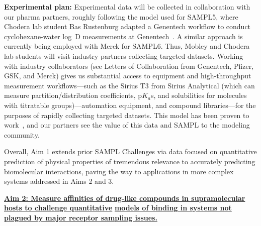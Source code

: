 \documentclass[11pt]{article}
\begin{document}
  
{\bf Experimental plan:}
Experimental data will be collected in collaboration with our pharma partners, roughly following the model used for SAMPL5, where Chodera lab student Bas Rustenburg adapted a Genentech workflow to conduct cyclohexane-water log~D measurements at Genentech~\cite{rustenburg_measuring_2016}.
A similar approach is currently being employed with Merck for SAMPL6.
Thus, Mobley and Chodera lab students will visit industry partners collecting targeted datasets.
Working with industry collaborators (see Letters of Collaboration from Genentech, Pfizer, GSK, and Merck) gives us substantial access to equipment and high-throughput measurement workflows---such as the Sirius T3 from Sirius Analytical (which can measure partition/distribution coefficients, p$K_a$s, and solubilities for molecules with titratable groups)---automation equipment, and compound libraries---for the purposes of rapidly collecting targeted datasets.
This model has been proven to work~\cite{rustenburg_measuring_2016}, and our partners see the value of this data and SAMPL to the modeling community.

Overall, Aim 1 extends prior SAMPL Challenges via data focused on quantitative prediction of physical properties of tremendous relevance to accurately predicting biomolecular interactions, paving the way to applications in more complex systems addressed in Aims 2 and 3.


\textbf{\underline{Aim 2: Measure affinities of drug-like compounds in supramolecular hosts to challenge quantitative}}
\textbf{\underline{models of binding in systems not plagued by major receptor sampling issues.}}
\end{document}

